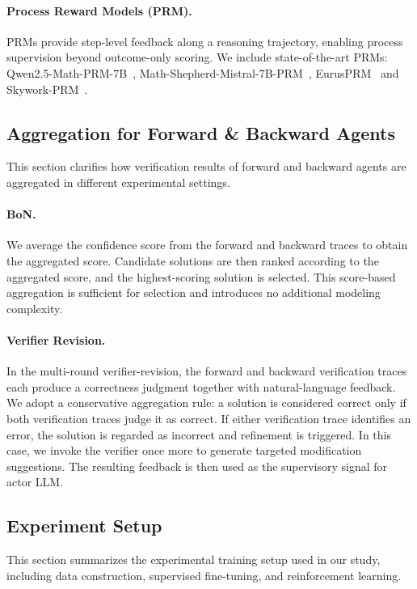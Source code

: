 \documentclass[11pt]{article}
\begin{document}
\paragraph{Process Reward Models (PRM).}
PRMs provide step-level feedback along a reasoning trajectory, enabling process supervision beyond outcome-only scoring. We include state-of-the-art PRMs: Qwen2.5-Math-PRM-7B~\cite{Qwen_Math_PRM}, Math-Shepherd-Mistral-7B-PRM~\cite{Math-Shepherd-PRM}, EurusPRM~\cite{EurusPRM} and Skywork-PRM~\cite{Skywork_PRM}.

\subsection{Aggregation for Forward \& Backward Agents}
\label{sec:appendix_aggregation}
This section clarifies how verification results of forward and backward agents are aggregated in different experimental settings.

\paragraph{BoN.}
We average the confidence score from the forward and backward traces to obtain the aggregated score.
Candidate solutions are then ranked according to the aggregated score, and the highest-scoring solution is selected.
This score-based aggregation is sufficient for selection and introduces no additional modeling complexity.

\paragraph{Verifier Revision.}
In the multi-round verifier-revision, the forward and backward verification traces each produce a correctness judgment together with natural-language feedback.
We adopt a conservative aggregation rule: a solution is considered correct only if both verification traces judge it as correct.
If either verification trace identifies an error, the solution is regarded as incorrect and refinement is triggered. In this case, we invoke the verifier  once more to generate targeted modification suggestions.
The resulting feedback is then used as the supervisory signal for actor LLM.

\subsection{Experiment Setup}
\label{sec:appendix_impl_details}

This section summarizes the experimental training setup used in our study, including data construction, supervised fine-tuning, and reinforcement learning.
\end{document}
